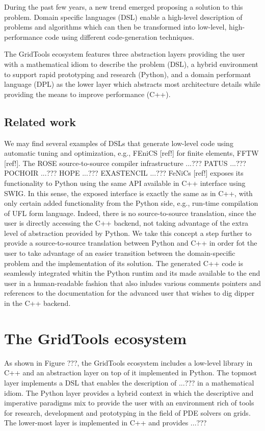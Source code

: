 \documentclass[english]{article}
\begin{document}
During the past few years, a new trend emerged proposing a solution to this problem. Domain specific languages (DSL) enable a high-level description of problems and algorithms which can then be transformed into low-level, high-performance code using different code-generation techniques.

The GridTools ecosystem features three abstraction layers providing the user with a mathematical idiom to describe the problem (DSL), a hybrid environment to support rapid prototyping and research (Python), and a domain performant language (DPL) as the lower layer which abstracts most architecture details while providing the means to improve performance (C++).

\subsection{Related work}
We may find several examples of DSLs that generate low-level code using automatic tuning and optimization, e.g., FEniCS [ref!] for finite elements, FFTW [ref!].
The ROSE source-to-source compiler infrastructure ...???
PATUS ...???
POCHOIR ...???
HOPE ...???
EXASTENCIL ...???
FeNiCs [ref!] exposes its functionality to Python using the same API available in C++ interface using SWIG.
In this sense, the exposed interface is exactly the same as in C++, with only certain added functionality from the Python side, e.g., run-time compilation of UFL form language.
Indeed, there is no source-to-source translation, since the user is directly accessing the C++ backend, not taking advantage of the extra level of abstraction provided by Python.
We take this concept a step further to provide a source-to-source translation between Python and C++ in order fot the user to take advantage of an easier transition between the domain-specific problem and the implementation of its solution.
The generated C++ code is seamlessly integrated whitin the Python runtim and its made available to the end user in a human-readable fashion that also inludes various comments pointers and references to the documentation for the advanced user that wishes to dig dipper in the C++ backend.


\section{The GridTools ecosystem}
As shown in Figure ???, the GridTools ecosystem includes a low-level library in C++ and an abstraction layer on top of it implemented in Python.
The topmost layer implements a DSL that enables the description of ...??? in a mathematical idiom.
The Python layer provides a hybrid context in which the descriptive and imperative paradigms mix to provide the user with an environment rich of tools for research, development and prototyping in the field of PDE solvers on grids.
The lower-most layer is implemented in C++ and provides ...???
\end{document}
